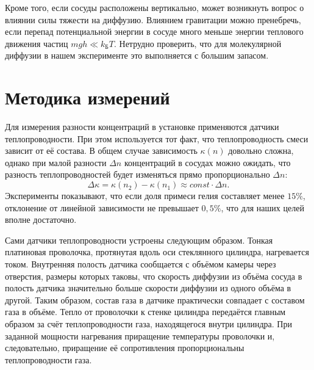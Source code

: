 \documentclass[a4paper,12pt]{article}
\begin{document}
Кроме того, если сосуды расположены вертикально, может возникнуть вопрос о влиянии силы тяжести на диффузию. Влиянием гравитации можно пренебречь, если перепад потенциальной энергии в сосуде много меньше энергии теплового движения частиц $mgh \ll k_{\text{Б}} T$. Нетрудно проверить, что для молекулярной диффузии в нашем эксперименте это выполняется с большим запасом.

\section{Методика измерений}

 Для измерения разности концентраций в установке применяются датчики теплопроводности. При этом используется тот факт, что теплопроводность смеси зависит от её состава. В общем случае зависимость $\kappa(n)$ довольно сложна, однако при малой разности $\Delta n$ концентраций в сосудах можно ожидать, что разность теплопроводностей будет изменяться прямо пропорционально $\Delta n$: $$\Delta \kappa = \kappa (n_2) - \kappa (n_1) \approx const \cdot \Delta n.$$
Эксперименты показывают, что если доля примеси гелия составляет менее $15\%$, отклонение от линейной зависимости не превышает $0,5\%$, что для наших целей вполне достаточно.

Сами датчики теплопроводности устроены следующим образом. Тонкая платиновая проволочка, протянутая вдоль оси стеклянного цилиндра, нагревается током. Внутренняя полость датчика сообщается с объёмом камеры через отверстия, размеры которых таковы, что скорость диффузии из объёма сосуда в полость датчика значительно больше скорости диффузии из одного объёма в другой. Таким образом, состав газа в датчике практически совпадает с составом газа в объёме. Тепло от проволочки к стенке цилиндра передаётся главным образом за счёт теплопроводности газа, находящегося внутри цилиндра. При заданной мощности нагревания приращение температуры проволочки и, следовательно, приращение её сопротивления пропорциональны теплопроводности газа.
\end{document}
